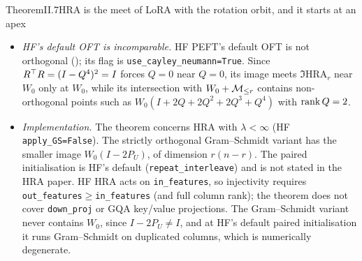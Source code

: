 \begin{restate}{Theorem}{II.7}{HRA is the meet of LoRA with the rotation orbit, and it starts at an apex}
\begin{enumerate}[label=(\alph*)]
\begin{itemize}
        For exact full-block Cayley OFT (the original paper; HF with \texttt{use\_cayley\_\allowbreak neumann=False}),
        $(W_0+\Mr)\cap\Im\mathrm{OFT}$ is dense in $\Im\mathrm{HRA}_r$ but not equal to it: $W_0H_{e_1}H_{e_2}$, with
        $H_{e_1}H_{e_2}=\diag(-1,-1,1,\dots,1)$, is missing. For exact block Cayley OFT with $b<n$ the intersection is a
        proper subset of $\Im\mathrm{HRA}_r$.
      \item \emph{HF's default OFT is incomparable.} HF PEFT's default OFT is not orthogonal
        (); its flag is \texttt{use\_cayley\_\allowbreak neumann=\allowbreak True}. Since $R^{\top} R=(I-Q^4)^2=I$ forces $Q=0$ near $Q=0$, its image meets
        $\Im\mathrm{HRA}_r$ near $W_0$ only at $W_0$, while its intersection with $W_0+\mathcal{M}_{\le r}$ contains non-orthogonal
        points such as $W_0(I+2Q+2Q^2+2Q^3+Q^4)$ with $\operatorname{rank} Q=2$.
      \item \emph{Implementation.} The theorem concerns HRA with $\lambda<\infty$ (HF \texttt{apply\_GS=False}). The
        strictly orthogonal Gram--Schmidt variant has the smaller image $W_0(I-2P_U)$, of dimension $r(n-r)$. The paired
        initialisation is HF's default (\texttt{repeat\_interleave}) and is not stated in the HRA paper. HF HRA acts on
        \texttt{in\_features}, so injectivity requires \texttt{out\_features}${}\ge{}$\texttt{in\_features} (and full
        column rank); the theorem does not cover \texttt{down\_proj} or GQA key/value projections. The Gram--Schmidt
        variant never contains $W_0$, since $I-2P_U\ne I$, and at HF's default paired initialisation it runs
        Gram--Schmidt on duplicated columns, which is numerically degenerate.
    \end{itemize}
\end{enumerate}
\end{restate}

